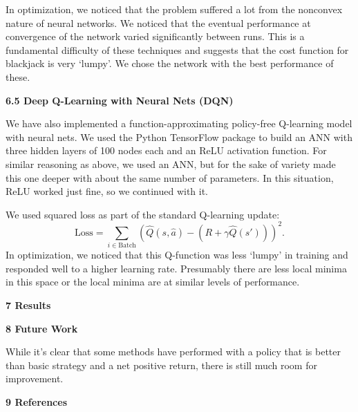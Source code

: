 \documentclass[12pt]{article}
\begin{document}
    In optimization, we noticed that the problem suffered a lot from the nonconvex nature of neural networks. We noticed that the eventual performance at convergence of the network varied significantly between runs. This is a fundamental difficulty of these techniques and suggests that the cost function for blackjack is very `lumpy'. We chose the network with the best performance of these.

    \textbf{6.5 Deep Q-Learning with Neural Nets (DQN)} \newline

    We have also implemented a function-approximating policy-free Q-learning model with neural nets. We used the Python TensorFlow package to build an ANN with three hidden layers of 100 nodes each and an ReLU activation function. For similar reasoning as above, we used an ANN, but for the sake of variety made this one deeper with about the same number of parameters. In this situation, ReLU worked just fine, so we continued with it.\newline

    We used squared loss as part of the standard Q-learning update: \[\text{Loss} = \sum_{i \in \text{Batch}}\left(\hat Q(s, \hat a) - \left(R + \gamma \hat Q(s')\right)\right)^2.\]\newline
    In optimization, we noticed that this Q-function was less `lumpy' in training and responded well to a higher learning rate. Presumably there are less local minima in this space or the local minima are at similar levels of performance.

    {\large \textbf{7 Results}} \newline

    {\large \textbf{8 Future Work}} \newline

    While it's clear that some methods have performed with a policy that is better than basic strategy and a net positive return, there is still much room for improvement.

    {\large \textbf{9 References}} \newline
\end{document}
